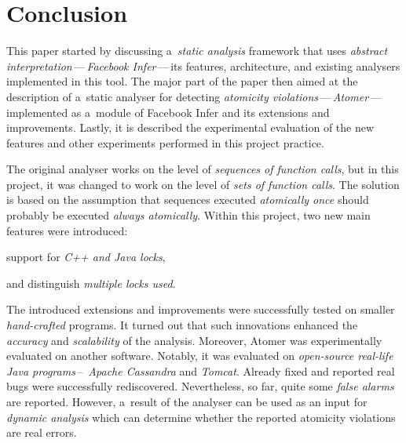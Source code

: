 
\section{Conclusion}
\label{sec:conc}

This paper started by discussing a~\emph{static analysis} framework that uses
\emph{abstract interpretation}\,---\,\emph{Facebook Infer}\,---\,its features,
architecture, and existing analysers implemented in this tool. The major part
of the paper then aimed at the description of a~static analyser for detecting
\emph{atomicity violations}\,---\,\emph{Atomer}\,---\,implemented as a~module
of Facebook Infer and its extensions and improvements. Lastly, it is described
the experimental evaluation of the new features and other experiments performed
in this project practice.

The original analyser works on the level of \emph{sequences of function calls},
but in this project, it was changed to work on the level of \emph{sets of
function calls}. The solution is based on the assumption that sequences
executed \emph{atomically once} should probably be executed \emph{always
atomically}. Within this project, two new main features were introduced:
\begin{enumerate*}[label={(\roman*)}]
    \item
        support for \emph{C++ and Java locks},

    \item
        and distinguish \emph{multiple locks used}.
\end{enumerate*}

The introduced extensions and improvements were successfully tested on
smaller \emph{hand-crafted} programs. It turned out that such innovations
enhanced the \emph{accuracy} and \emph{scalability} of the analysis. Moreover,
Atomer was experimentally evaluated on another software. \linebreak Notably,
it was evaluated on \emph{open-source real-life Java programs}\,--\,\emph{%
Apache Cassandra} and \emph{Tomcat}. Already fixed and reported real bugs
were successfully rediscovered. Nevertheless, so far, quite some \emph{false
alarms} are reported. However, a~result of the analyser can be used as an
input for \emph{dynamic analysis} which can determine whether the reported
atomicity violations are real errors.

